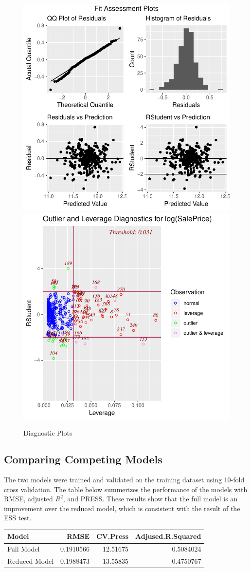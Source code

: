\documentclass[american,]{article}
\theoremstyle{definition}
\theoremstyle{definition}
\theoremstyle{definition}
\theoremstyle{remark}
\begin{document}
\begin{figure}[htbp]

{\centering \includegraphics[width=0.45\linewidth]{HousePriceRegressionAnalysis_files/figure-latex/diag-plots-1} \includegraphics[width=0.45\linewidth]{HousePriceRegressionAnalysis_files/figure-latex/diag-plots-2} 

}

\caption{Diagnostic Plots}\label{fig:diag-plots}
\end{figure}

\hypertarget{comparing-competing-models}{%
\subsection{Comparing Competing
Models}\label{comparing-competing-models}}

The two models were trained and validated on the training dataset using
10-fold cross validation. The table below summerizes the performance of
the models with RMSE, adjusted \(R^2\), and PRESS. These results show
that the full model is an improvement over the reduced model, which is
consistent with the result of the ESS test.

\begin{table}[H]
\centering
\begin{tabular}{lrrr}
\toprule
Model & RMSE & CV.Press & Adjused.R.Squared\\
\midrule
Full Model & 0.1910566 & 12.51675 & 0.5084024\\
Reduced Model & 0.1988473 & 13.55835 & 0.4750767\\
\bottomrule
\end{tabular}
\end{table}
\end{document}
